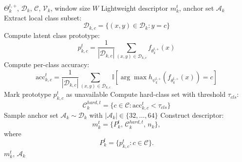 \documentclass[conference]{IEEEtran}
\begin{document}
\begin{algorithm}[t]
\caption{Lightweight Descriptor Construction at Client $k$}
\label{alg:descriptor}
\footnotesize
\begin{algorithmic}[1]
\REQUIRE $\Theta_k^{t,+}$, $\mathcal{D}_k$, $\mathcal{C}$, $\mathcal{V}_k$, window size $W$
\ENSURE Lightweight descriptor $m_k^t$, anchor set $\mathcal{A}_k$
    \STATE Extract local class subset:
    \begin{equation}
\mathcal{D}_{k,c}
    =
    \{(x,y)\in\mathcal{D}_k:y=c\}
\end{equation}
        \STATE Compute latent class prototype:
        \begin{equation}
p_{k,c}^{t}
        =
        \frac{1}{|\mathcal{D}_{k,c}|}
        \sum_{(x,y)\in\mathcal{D}_{k,c}}
        f_{\theta_k^{t,+}}(x)
\end{equation}
        \STATE Compute per-class accuracy:
        \begin{equation}
\mathrm{acc}_{k,c}^t
        =
        \frac{1}{|\mathcal{D}_{k,c}|}
        \sum_{(x,y)\in\mathcal{D}_{k,c}}
        \mathbb{I}[\arg\max h_{\psi_k^{t,+}}(f_{\theta_k^{t,+}}(x))=c]
\end{equation}
    \ELSE
        \STATE Mark prototype $p_{k,c}^{t}$ as unavailable
    \ENDIF
\ENDFOR
\STATE Compute hard-class set with threshold $\tau_{cls}$:
\begin{equation}
\mathcal{C}_k^{hard,t}=\{c\in\mathcal{C}:\mathrm{acc}_{k,c}^t<\tau_{cls}\}
\end{equation}
\STATE Sample anchor set $\mathcal{A}_k \sim \mathcal{D}_k$ with $|\mathcal{A}_k|\in\{32,\dots,64\}$
\STATE Construct descriptor:
\begin{equation}
m_k^t
=
\{P_k^t,\,\mathcal{C}_k^{hard,t},\,n_k\},
\end{equation}
where
\begin{equation}
P_k^t=\{p_{k,c}^{t}:c\in\mathcal{C}\}.
\end{equation}
\RETURN $m_k^t$, $\mathcal{A}_k$
\end{algorithmic}
\end{algorithm}
\end{document}
